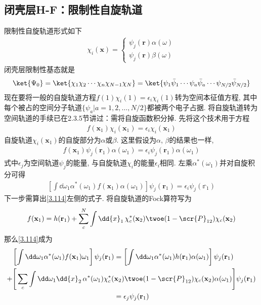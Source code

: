 \subsection{闭壳层H-F：限制性自旋轨道}
限制性自旋轨道形式如下
\begin{align}
\chi_i(\mathbf{x}) =
\begin{cases*}
\psi_j(\mathbf{r})\alpha(\omega)\\
\psi_j(\mathbf{r})\beta(\omega)
\end{cases*}
\end{align}
闭壳层限制性基态就是
\begin{align}
\ket{\Psi_0} = \ket{\chi_1\chi_2\cdots\chi_n\chi_{N-1}\chi_N} = \ket{\psi_1\bar{\psi}_1\cdots\psi_a\bar{\psi}_a\cdots\psi_{N/2}\bar{\psi}_{N/2}}
\end{align}
现在要将一般的自旋轨道\hft 方程$f(1)\chi_i(1)=\epsilon_i\chi_i(1)$转为空间本征值方程, 其中每个被占的空间分子轨道$\{\psi_a|a=1,2,\ldots,N/2\}$都被两个电子占据. 将自旋轨道转为空间轨道的手续已在2.3.5节讲过：需将自旋函数积分掉. 先将这个技术用于\hft 方程
\begin{align}
f(\mathbf{x}_1)\chi_i(\mathbf{x}_1) = \epsilon_i\chi_i(\mathbf{x}_1)
\end{align}
自旋轨道$\chi_i(\mathbf{x}_1)$的自旋部分为$\alpha$或$\beta$. 这里假设为$\alpha$, $\beta$的结果也一样,
\begin{align}
f(\mathbf{x}_1)\psi_j(\mathbf{r}_1)\alpha(\omega_1) = \epsilon_i\psi_j(\mathbf{r}_1)\alpha(\omega_1)
\end{align}
式中$\epsilon_j$为空间轨道$\psi_j$的能量, 与自旋轨道$\chi_i$的能量$\epsilon_i$相同. 左乘$\alpha^*(\omega_1)$并对自旋积分可得
\begin{align}
\label{3.114}
\left[ \int\dd\omega_1\alpha^*(\omega_1)f(\mathbf{x}_1)\alpha(\omega_1) \right]\psi_j(\mathbf{r}_1) = \epsilon_i\psi_j(\mathbb{r}_1)
\end{align}
下一步需算出\eqref{3.114}左侧的式子. 将自旋轨道的Fock算符写为
\begin{align}
f(\mathbf{x}_1) = h(\mathbf{r}_1) + \sum_c^N\int\dd{x}_1\,\chi_c^*(\mathbf{x}_2)\twoe(1-\scr{P}_{12})\chi_c(\mathbf{x}_2)
\end{align}
那么\eqref{3.114}成为
\begin{align}
\left[ \int\dd\omega_1\alpha^*(\omega_1)f(\mathbf{x}_1)\omega_1 \right]\psi_j(\mathbf{r}_1) &= \left[ \int\dd\omega_1\alpha^*(\omega_1)h(\mathbf{r}_1)\alpha(\omega_1) \right]\psi_j(\mathbf{r}_1) \notag\\
 +\Bigg[ \sum_c\int\dd\omega_1\dd{x}_2\,\alpha^*(\omega_1)\chi_c^*(&\mathbf{x}_2)\twoe(1-\scr{P}_{12})\chi_c(\mathbf{x}_2)\alpha(\omega_1) \Bigg]\psi_j(\mathbf{r}_1)  \notag\\
 & = \epsilon_j\psi_j(\mathbf{r}_1)
\end{align}
